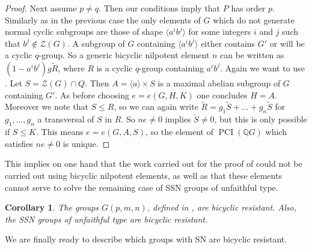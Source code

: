 \documentclass[a4paper,10pt]{amsart}
\newtheorem{corollary}[lemma]{Corollary}
\theoremstyle{definition}
\theoremstyle{remark}
\newcommand\PCI{\operatorname{PCI}}
\newcommand{\ZZ}{\mathcal{Z}}
\newcommand{\Q}{{\mathbb Q}}
\begin{document}
\begin{proof}
Next assume $p \neq q$. Then our conditions imply that $P$ has order $p$. Similarly as in the previous case the only elements of $G$ which do not generate normal cyclic subgroups are those of shape $\langle a^ib^j \rangle$ for some integers $i$ and $j$ such that $b^j \notin \ZZ(G)$. A subgroup of $G$ containing $\langle a^ib^j \rangle$ either contains $G'$ or will be a cyclic $q$-group. So a generic bicyclic nilpotent element $n$ can be written as $(1-a^ib^j)g\widetilde{R}$, where $R$ is a cyclic $q$-group containing $a^ib^j$. Again we want to use . Let $S = \ZZ(G) \cap Q$. Then $A = \langle a \rangle \times S$ is a maximal abelian subgroup of $G$ containing $G'$. As before choosing $e = e(G,H,K)$ one concludes $H=A$. Moreover we note that $S \leq R$, so we can again write $\widetilde{R} = g_1\widetilde{S} + ... + g_n\widetilde{S}$ for $g_1,...,g_n$ a transversal of $S$ in $R$. So $ne \neq 0$ implies $\widetilde{S} \neq 0$, but this is only possible if $S \leq K$. This means $e = e(G,A,S)$, so the element of $\PCI(\Q G)$ which satisfies $ne \neq 0$ is unique. 
\end{proof}

This implies on one hand that the work carried out for the proof of  could not be carried out using bicyclic nilpotent elements, as well as that these elements cannot serve to solve the remaining case of SSN groups of unfaithful type.

\begin{corollary}\label{the hardest cases are resistant}
The groups $G(p,m,n)$, defined in , are bicyclic resistant. Also, the SSN groups of unfaithful type are bicyclic resistant.
\end{corollary}

We are finally ready to describe which groups with SN are bicyclic resistant.
\end{document}
